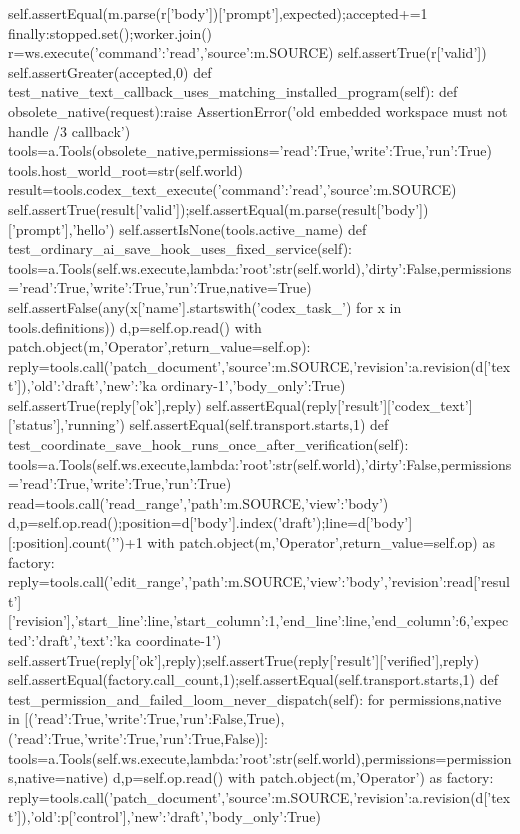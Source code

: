     self.assertEqual(m.parse(r['body'])['prompt'],expected);accepted+=1
  finally:stopped.set();worker.join()
  r=ws.execute({'command':'read','source':m.SOURCE})
  self.assertTrue(r['valid'])
  self.assertGreater(accepted,0)
 def test_native_text_callback_uses_matching_installed_program(self):
  def obsolete_native(request):raise AssertionError('old embedded workspace must not handle /3 callback')
  tools=a.Tools(obsolete_native,permissions={'read':True,'write':True,'run':True})
  tools.host_world_root=str(self.world)
  result=tools.codex_text_execute({'command':'read','source':m.SOURCE})
  self.assertTrue(result['valid']);self.assertEqual(m.parse(result['body'])['prompt'],'hello')
  self.assertIsNone(tools.active_name)
 def test_ordinary_ai_save_hook_uses_fixed_service(self):
  tools=a.Tools(self.ws.execute,lambda:{'root':str(self.world),'dirty':False},permissions={'read':True,'write':True,'run':True},native=True)
  self.assertFalse(any(x['name'].startswith('codex_task_') for x in tools.definitions))
  d,p=self.op.read()
  with patch.object(m,'Operator',return_value=self.op):
   reply=tools.call('patch_document',{'source':m.SOURCE,'revision':a.revision(d['text']),'old':'draft','new':'ka ordinary-1','body_only':True})
  self.assertTrue(reply['ok'],reply)
  self.assertEqual(reply['result']['codex_text']['status'],'running')
  self.assertEqual(self.transport.starts,1)
 def test_coordinate_save_hook_runs_once_after_verification(self):
  tools=a.Tools(self.ws.execute,lambda:{'root':str(self.world),'dirty':False},permissions={'read':True,'write':True,'run':True})
  read=tools.call('read_range',{'path':m.SOURCE,'view':'body'})
  d,p=self.op.read();position=d['body'].index('draft');line=d['body'][:position].count('\n')+1
  with patch.object(m,'Operator',return_value=self.op) as factory:
   reply=tools.call('edit_range',{'path':m.SOURCE,'view':'body','revision':read['result']['revision'],'start_line':line,'start_column':1,'end_line':line,'end_column':6,'expected':'draft','text':'ka coordinate-1'})
  self.assertTrue(reply['ok'],reply);self.assertTrue(reply['result']['verified'],reply)
  self.assertEqual(factory.call_count,1);self.assertEqual(self.transport.starts,1)
 def test_permission_and_failed_loom_never_dispatch(self):
  for permissions,native in [({'read':True,'write':True,'run':False},True),({'read':True,'write':True,'run':True},False)]:
   tools=a.Tools(self.ws.execute,lambda:{'root':str(self.world)},permissions=permissions,native=native)
   d,p=self.op.read()
   with patch.object(m,'Operator') as factory:
    reply=tools.call('patch_document',{'source':m.SOURCE,'revision':a.revision(d['text']),'old':p['control'],'new':'draft','body_only':True})
